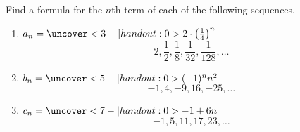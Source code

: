 \begin{frame}
\begin{example}
Find a formula for the $n$th term of each of the following sequences.  
\begin{enumerate}
\item<alert@2-3>  $a_n = \uncover<3-| handout:0>{2\cdot \big(\frac{1}{4}\big)^n}$
\[
2, \frac{1}{2},\frac{1}{8},\frac{1}{32},\frac{1}{128},\ldots
\]
\item<alert@4-5>  $b_n = \uncover<5-| handout:0>{(-1)^nn^2}$
\[
-1,4,-9,16,-25,\ldots
\]
\item<alert@6-7>  $c_n = \uncover<7-| handout:0>{-1+6n}$
\[
-1,5,11,17,23,\ldots
\]
\end{enumerate}
\end{example}

\end{frame}
